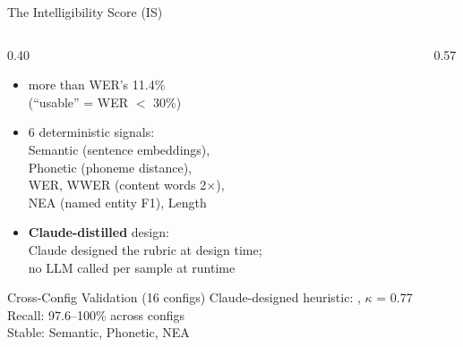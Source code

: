 \begin{frame}[shrink=15]{The Intelligibility Score (IS)}
  \begin{columns}[T]
    \begin{column}{0.40\textwidth}

      \vspace{3pt}

      \begin{itemize}\small
        \item {} more than WER's 11.4\%\\
              {\scriptsize (``usable'' = WER $<$ 30\%)}
        \item 6 deterministic signals:\\
              {\scriptsize Semantic {\tiny(sentence embeddings)},\\
              Phonetic {\tiny(phoneme distance)},\\
              WER, WWER {\tiny(content words 2$\times$)},\\
              NEA {\tiny(named entity F1)}, Length}
        \item \textbf{Claude-distilled} design:\\
              {\scriptsize Claude designed the rubric at design time;\\
              no LLM called per sample at runtime}
      \end{itemize}

      \vspace{2pt}

      \begin{block}{\scriptsize Cross-Config Validation (16 configs)}
        {\scriptsize Claude-designed heuristic: , $\kappa$ = 0.77\\
        Recall: 97.6--100\% across configs\\
        Stable: Semantic, Phonetic, NEA}
      \end{block}
    \end{column}
    \begin{column}{0.57\textwidth}
      
    \end{column}
  \end{columns}


\end{frame}

